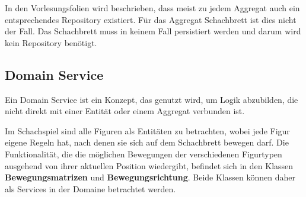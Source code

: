In den Vorlesungsfolien wird beschrieben, dass meist zu jedem Aggregat auch ein entsprechendes Repository existiert. 
Für das Aggregat Schachbrett ist dies nicht der Fall. 
Das Schachbrett muss in keinem Fall persistiert werden und darum wird kein Repository benötigt. 

\subsection{Domain Service}

Ein Domain Service ist ein Konzept, das genutzt wird, um Logik abzubilden, die nicht direkt mit einer Entität oder einem Aggregat verbunden ist.

Im Schachspiel sind alle Figuren als Entitäten zu betrachten, wobei jede Figur eigene Regeln hat, nach denen sie sich auf dem Schachbrett bewegen darf.
Die Funktionalität, die die möglichen Bewegungen der verschiedenen Figurtypen ausgehend von ihrer aktuellen Position wiedergibt, befindet sich in den Klassen \textbf{Bewegungsmatrizen} und \textbf{Bewegungsrichtung}.
Beide Klassen können daher als Services in der Domaine betrachtet werden.
